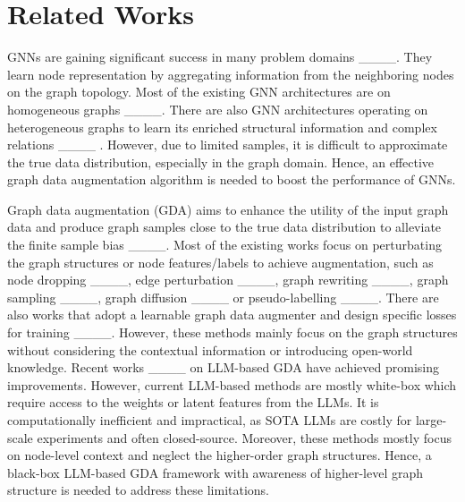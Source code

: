 \section{Related Works}

GNNs are gaining significant success in many problem domains ____.
%
They learn node representation by aggregating information from the neighboring nodes on the graph topology. 
%
Most of the existing GNN architectures are on homogeneous graphs ____.
%
There are also GNN architectures  operating on heterogeneous graphs to learn its enriched structural information and complex relations
____ .
%
However, due to limited samples, it is difficult to approximate the true data distribution, especially in the graph domain.
%
Hence, an effective graph data augmentation algorithm is needed to boost the performance of GNNs.

Graph data augmentation (GDA) aims to enhance the utility of the input graph data and produce graph samples close to the true data distribution to alleviate the finite sample bias ____.
%
Most of the existing works focus on perturbating the graph structures or node features/labels to achieve augmentation,
such as node dropping ____, edge perturbation ____, graph rewriting ____, graph sampling ____, graph diffusion ____ or pseudo-labelling ____.
%
There are also works that adopt a learnable graph data augmenter and design specific losses for training ____.
%
However, these methods mainly focus on the graph structures without considering the contextual information or introducing open-world knowledge.
%
Recent works ____ on LLM-based GDA have achieved promising improvements. However, current LLM-based methods are mostly white-box which require access to the weights or latent features from the LLMs. It is computationally inefficient and impractical, as SOTA LLMs are costly for large-scale experiments and often closed-source.
%
Moreover, these methods mostly focus on node-level context and neglect the higher-order graph structures.
%
Hence, a black-box LLM-based GDA framework with awareness of higher-level graph structure is needed to address these limitations.
%



